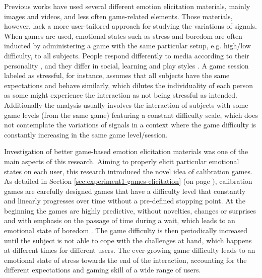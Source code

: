 
Previous works have used several different emotion elicitation materials, mainly images and videos, and less often game-related elements. Those materials, however, lack a more user-tailored approach for studying the variations of signals. When games are used, emotional states such as stress and boredom are often inducted by administering a game with the same particular setup, e.g. high/low difficulty, to all subjects. People respond differently to media according to their personality \parencite{ravaja2004effects}, and they differ in social, learning and play styles \parencite{goldberg1993structure}. A game session labeled as stressful, for instance, assumes that all subjects have the same expectations and behave similarly, which dilutes the individuality of each person as some might experience the interaction as not being stressful as intended. Additionally the analysis usually involves the interaction of subjects with some game levels (from the same game) featuring a constant difficulty scale, which does not contemplate the variations of signals in a context where the game difficulty is constantly increasing in the same game level/session.

Investigation of better game-based emotion elicitation materials was one of the main aspects of this research. Aiming to properly elicit particular emotional states on each user, this research introduced the novel idea of calibration games. As detailed in Section \ref{sec:experiment1-games-elicitation} (on page \pageref{sec:experiment1-games-elicitation}), calibration games are carefully designed games that have a difficulty level that constantly and linearly progresses over time without a pre-defined stopping point. At the beginning the games are highly predictive, without novelties, changes or surprises and with emphasis on the passage of time during a wait, which leads to an emotional state of boredom \parencite{van2010behave,koster2013theory,schell2014art}. The game difficulty is then periodically increased until the subject is not able to cope with the challenges at hand, which happens at different times for different users. The ever-growing game difficulty leads to an emotional state of stress towards the end of the interaction, accounting for the different expectations and gaming skill of a wide range of users.

